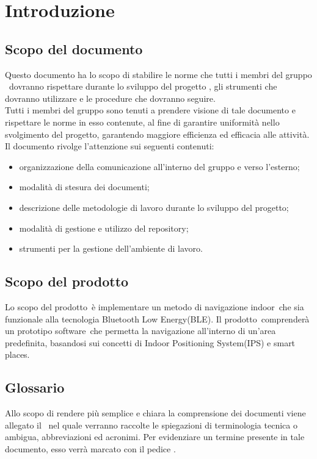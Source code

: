 \documentclass[../NormeProgetto.tex]{subfiles}
\begin{document}
\section{Introduzione}
	\subsection{Scopo del documento}
	Questo documento ha lo scopo di stabilire le norme che tutti i membri del gruppo \leaf\ dovranno rispettare durante lo sviluppo del progetto \progetto\g, gli strumenti che dovranno utilizzare e le procedure che dovranno seguire. \\
	Tutti i membri del gruppo sono tenuti a prendere visione di tale documento e rispettare le norme in esso contenute, al fine di garantire uniformità nello svolgimento del progetto, garantendo maggiore efficienza ed efficacia alle attività. \\
	Il documento rivolge l'attenzione sui seguenti contenuti:
	\begin{itemize}
	\item organizzazione della comunicazione all'interno del gruppo e verso l'esterno;
	\item modalità di stesura dei documenti;
	\item descrizione delle metodologie di lavoro durante lo sviluppo del progetto;
	\item modalità di gestione e utilizzo del repository\g;
	\item strumenti per la gestione dell'ambiente di lavoro.
	\end{itemize}

	\subsection{Scopo del prodotto}
	Lo scopo del prodotto\g\ è implementare un metodo di navigazione indoor\g\ che sia funzionale alla tecnologia Bluetooth Low Energy(BLE\g).
	Il prodotto\g\ comprenderà un prototipo software\g\ che permetta la navigazione all’interno di un’area predefinita, basandosi sui concetti di Indoor Positioning System(IPS\g) e smart places\g.

	\subsection{Glossario}
	Allo scopo di rendere più semplice e chiara la comprensione dei documenti viene allegato il \glossariov\ nel quale verranno raccolte le spiegazioni di  terminologia tecnica o  ambigua,
abbreviazioni ed acronimi. Per evidenziare un termine presente in tale documento, esso verrà marcato con il pedice \g.
\end{document}
